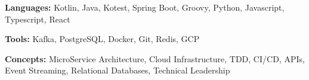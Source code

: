 \documentclass[letterpaper,11pt]{article}
\begin{document}
\begin{comment}
\resheading{Projects}
  \begin{myitemize}

    \item \textbf{BattleShip with AI Implementation}  \hfill \textit{github.com/jbenedek/BattleShipAI}
    {\normalsize
      \begin{itemize}
          \resitem{Python implementation of the game Battleship, with the ability to play against the computer}
          \resitem{AI implementation performed 45\% better than a random \& naive approach}
      \end{itemize}
    }
    \item \textbf{The VIM Quiz Game}  \hfill  \textit{github.com/jbenedek/c335-finalproject}
    { \normalsize
      \begin{itemize}
	         \resitem{Term project for Computer Structures/Embedded Systems (C335) completed in groups of 2}
	         \resitem{Approximately 1,000 lines of code, written in C, including driver files to interface with LCD screen, SD card, DAC, gyroscope, \& Wii Nunchuk on a STM32 Discovery Board}
           \resitem{Implemented I2C, UART, SPI, DMA, \& Interrupt protocols}
      \end{itemize}
      }
    \item \textbf{Sudoku Verifier}  \hfill \textit{github.com/jbenedek/SudokuVerifier}
    {\normalsize
      \begin{itemize}
	        \resitem{Command-line program that verifies the accuracy of a completed Sudoku Puzzle}
	        \resitem{Programmed in Java using object-oriented programming principles of encapsulation and composition}
      \end{itemize}
    }
    \end{myitemize}
\end{comment}


\begin{myitemize}

\item \textbf{Languages: }{\normalsize Kotlin, Java, Kotest, Spring Boot, Groovy, Python, Javascript, Typescript, React}
\item \textbf{Tools: } {\normalsize Kafka, PostgreSQL, Docker, Git, Redis, GCP}
\item \textbf{Concepts: } {\normalsize MicroService Architecture, Cloud Infrastructure, TDD, CI/CD, APIs, Event Streaming, Relational Databases, Technical Leadership}

\end{myitemize}


\end{document}
